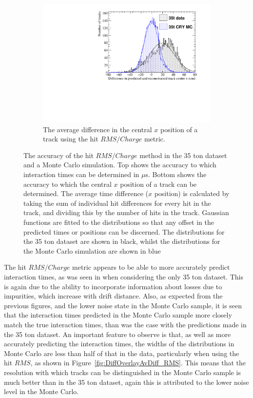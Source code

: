 \begin{figure}
  \begin{subfigure}{0.6\textwidth}
    \centering
    \includegraphics[width=\textwidth]{Overlay_AvXPosDiff_RMS_Int}
    \caption{The average difference in the central $x$ position of a track using the hit $RMS/Charge$ metric.}
    \label{fig:DiffOverlayAvDiff_RMS_Int_X}
  \end{subfigure}
  \caption[Comparing the accuracy of the hit $RMS$ method in the 35 ton dataset and a Monte Carlo simulation]
          {The accuracy of the hit $RMS/Charge$ method in the 35 ton dataset and a Monte Carlo simulation. Top shows the accuracy to which interaction times can be determined in $\mu$s. Bottom shows the accuracy to which the central $x$ position of a track can be determined. The average time difference ($x$ position) is calculated by taking the sum of individual hit differences for every hit in the track, and dividing this by the number of hits in the track. Gaussian functions are fitted to the distributions so that any offset in the predicted times or positions can be discerned. The distributions for the 35 ton dataset are shown in black, whilst the distributions for the Monte Carlo simulation are shown in blue}
  \label{fig:DiffOverlayAvDiff_RMS_Int}
\end{figure}

The hit $RMS/Charge$ metric appears to be able to more accurately predict interaction times, as was seen in when considering the only 35 ton dataset. This is again due to the ability to incorporate information about losses due to impurities, which increase with drift distance. Also, as expected from the previous figures, and the lower noise state in the Monte Carlo sample, it is seen that the interaction times predicted in the Monte Carlo sample more closely match the true interaction times, than was the case with the predictions made in the 35 ton dataset. An important feature to observe is that, as well as more accurately predicting the interaction times, the widths of the distributions in Monte Carlo are less than half of that in the data, particularly when using the hit $RMS$, as shown in Figure~\ref{fig:DiffOverlayAvDiff_RMS}. This means that the resolution with which tracks can be distinguished in the Monte Carlo sample is much better than in the 35 ton dataset, again this is attributed to the lower noise level in the Monte Carlo. \\


